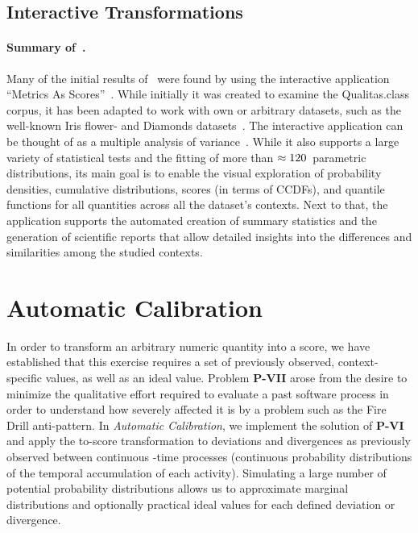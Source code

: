 \subsection{Interactive Transformations}\label{ssec:summary-honel2023masjoss}
%
\paragraph{Summary of~.}
Many of the initial results of~ were found by using the interactive application ``Metrics As Scores''~\cite{honel2023masgithub}.
While initially it was created to examine the Qualitas.class corpus, it has been adapted to work with own or arbitrary datasets, such as the well-known Iris flower- and Diamonds datasets~\cite{fisher1936iris,honel2023iris,honel2023diamonds}.
The interactive application can be thought of as a multiple analysis of variance~\cite{chambers2017statistical}.
While it also supports a large variety of statistical tests and the fitting of more than $\approx{120}\,$ parametric distributions, its main goal is to enable the visual exploration of probability densities, cumulative distributions, scores (in terms of CCDFs), and quantile functions for all quantities across all the dataset's contexts.
Next to that, the application supports the automated creation of summary statistics and the generation of scientific reports that allow detailed insights into the differences and similarities among the studied contexts.




\section{Automatic Calibration}\label{sec:ac}
%
In order to transform an arbitrary numeric quantity into a score, we have established that this exercise requires a set of previously observed, context-specific values, as well as an ideal value.
Problem \textbf{P-VII} arose from the desire to minimize the qualitative effort required to evaluate a past software process in order to understand how severely affected it is by a problem such as the Fire Drill anti-pattern.
In \emph{Automatic Calibration}, we implement the solution of \textbf{P-VI} and apply the to-score transformation to deviations and divergences as previously observed between continuous\allowbreak
-time processes (continuous probability distributions of the temporal accumulation of each activity).
Simulating a large number of potential probability distributions allows us to approximate marginal distributions and optionally practical ideal values for each defined deviation or divergence.


